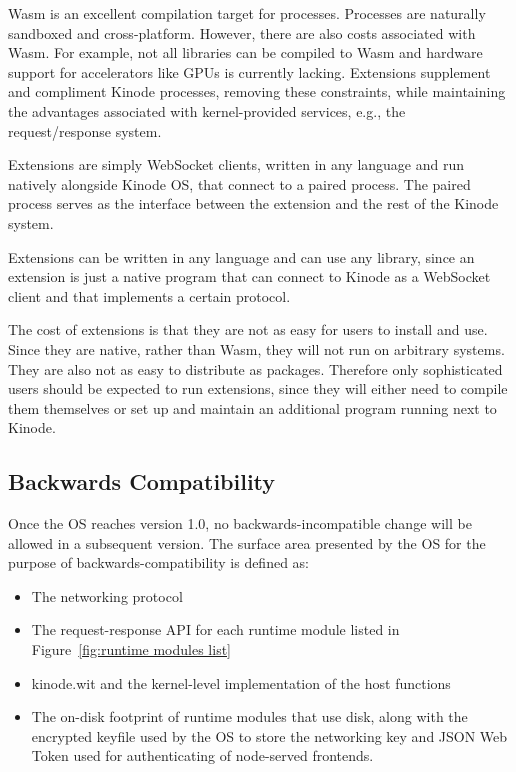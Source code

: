 \documentclass[runningheads]{llncs}
\begin{document}
Wasm is an excellent compilation target for processes.
Processes are naturally sandboxed and cross-platform.
However, there are also costs associated with Wasm.
For example, not all libraries can be compiled to Wasm and hardware support for accelerators like GPUs is currently lacking.
Extensions supplement and compliment Kinode processes, removing these constraints, while maintaining the advantages associated with kernel-provided services, e.g., the request/response system.

Extensions are simply WebSocket clients, written in any language and run natively alongside Kinode OS, that connect to a paired process.
The paired process serves as the interface between the extension and the rest of the Kinode system.

Extensions can be written in any language and can use any library, since an extension is just a native program that can connect to Kinode as a WebSocket client and that implements a certain protocol.

The cost of extensions is that they are not as easy for users to install and use.
Since they are native, rather than Wasm, they will not run on arbitrary systems.
They are also not as easy to distribute as packages.
Therefore only sophisticated users should be expected to run extensions, since they will either need to compile them themselves or set up and maintain an additional program running next to Kinode.

\subsection{Backwards Compatibility}
\label{sec:osbackwardscompat}

Once the OS reaches version 1.0, no backwards-incompatible change will be allowed in a subsequent version.
The surface area presented by the OS for the purpose of backwards-compatibility is defined as:
\begin{itemize}
    \item The networking protocol
    \item The request-response API for each runtime module listed in Figure~\ref{fig:runtime modules list}
    \item kinode.wit and the kernel-level implementation of the host functions
    \item The on-disk footprint of runtime modules that use disk, along with the encrypted keyfile used by the OS to store the networking key and JSON Web Token used for authenticating of node-served frontends.
\end{itemize}
\end{document}
